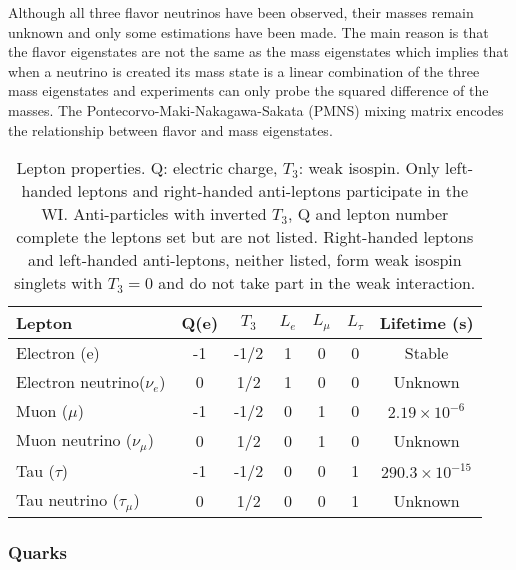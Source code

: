Although all three flavor neutrinos have been observed, their masses remain unknown and only some estimations have been made\cite{nu_mass}. The main reason is that the flavor eigenstates are not the same as the mass eigenstates which implies that when a neutrino is created its mass state is a linear combination of the three mass eigenstates and experiments can only probe the squared difference of the masses. The Pontecorvo-Maki-Nakagawa-Sakata (PMNS) mixing matrix encodes the relationship between flavor and mass eigenstates.
\begin{center}
\begin{table}[h]
\centering
\footnotesize
\begin{tabular}{lcccccc} \hline
Lepton                      & Q(e) & $T_3$&$L_e$ & $L_\mu$ & $L_\tau$ & Lifetime (s)                \\ \hline
Electron (e)                & -1   & -1/2 & 1    & 0       & 0        & Stable                      \\ %
Electron neutrino($\nu_e$)  & 0    &  1/2 & 1    & 0       & 0        & Unknown                     \\ %
Muon ($\mu$)                & -1   & -1/2 & 0    & 1       & 0        & $2.19\times10^{-6}$\\ %
Muon neutrino ($\nu_\mu$)   & 0    &  1/2 & 0    & 1       & 0        & Unknown                     \\ %
Tau ($\tau$)                & -1   & -1/2 & 0    & 0       & 1        & $290.3\times10^{-15}$    \\ %
Tau neutrino ($\tau_\mu$)   & 0    &  1/2 & 0    & 0       & 1        & Unknown                     \\ \hline
\end{tabular}
\caption[Lepton properties.]{Lepton properties\cite{pdg}. Q: electric charge, $T_3$: weak isospin. Only left-handed leptons and right-handed anti-leptons participate in the WI. Anti-particles with inverted $T_3$, Q and lepton number complete the leptons set but are not listed. Right-handed leptons and left-handed anti-leptons, neither listed, form weak isospin singlets with $T_3=0$ and do not take part in the weak interaction.}\label{leptons}
\end{table}
\end{center}

\subsubsection{Quarks}

